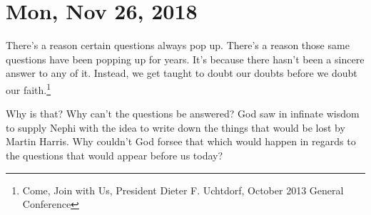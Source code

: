 \section{Mon, Nov 26, 2018}

There's a reason certain questions always pop up. There's a reason those same
questions have been popping up for years. It's because there hasn't been a sincere
answer to any of it. Instead, we get taught to doubt our doubts before we doubt our
faith.\footnote{Come, Join with Us, President Dieter F. Uchtdorf, October 2013 
General Conference}

Why is that? Why can't the questions be answered? God saw in infinate wisdom to
supply Nephi with the idea to write down the things that would be lost by Martin
Harris. Why couldn't God forsee that which would happen in regards to the questions
that would appear before us today?